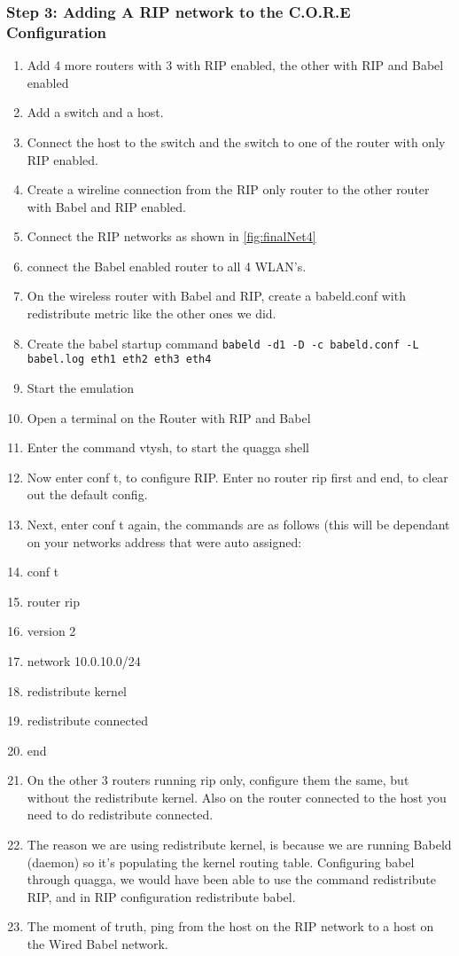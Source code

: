 \documentclass[main.tex]{subfiles}
\begin{document}
\subsubsection{Step 3:  Adding A RIP network to the C.O.R.E Configuration}
\begin{enumerate}[noitemsep,label=$\bullet$,leftmargin=20mm,labelsep=0.5cm]

\item Add 4 more routers with 3 with RIP enabled, the other with RIP and Babel enabled
\item Add a switch and a host.
\item Connect the host to the switch and the switch to one of the router with only RIP enabled. 
\item Create a wireline connection from the RIP only router to the other router with Babel and RIP enabled.
\item Connect the RIP networks as shown in \ref{fig:finalNet4}
\item connect the Babel enabled router to all 4 WLAN's.
\item On the wireless router with Babel and RIP, create a babeld.conf with redistribute metric like the other ones we did.
\item Create the babel startup command \texttt{babeld -d1 -D -c babeld.conf -L babel.log eth1 eth2 eth3 eth4}

\item Start the emulation
\item Open a terminal on the Router with RIP and Babel
\item Enter the command vtysh, to start the quagga shell
\item Now enter conf t, to configure RIP.  Enter no router rip first and end, to clear out the default config.
\item Next, enter conf t again, the commands are as follows (this will be dependant on your networks address that were auto assigned:

\item conf t
\item router rip
\item version 2
\item network 10.0.10.0/24
\item redistribute kernel
\item redistribute connected
\item end

\item On the other 3 routers running rip only, configure them the same, but without the redistribute kernel.  Also on the router connected to the host you need to do redistribute connected.
\item The reason we are using redistribute kernel, is because we are running Babeld (daemon) so it's populating the kernel routing table.  Configuring babel through quagga, we would have been able to use the command redistribute RIP, and in RIP configuration redistribute babel.  

\item The moment of truth, ping from the host on the RIP network to a host on the Wired Babel network.


\end{enumerate}
\end{document}
